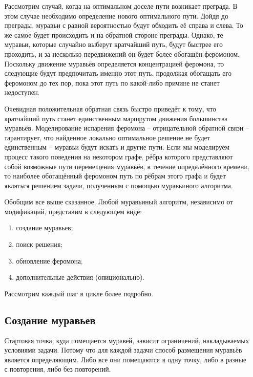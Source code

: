         Рассмотрим случай, когда на оптимальном доселе пути возникает преграда.
        В этом случае необходимо определение нового оптимального пути. 
        Дойдя до преграды, муравьи с равной вероятностью будут обходить её справа и слева. 
        То же самое будет происходить и на обратной стороне преграды. 
        Однако, те муравьи, которые случайно выберут кратчайший путь,
        будут быстрее его проходить, и за несколько передвижений он 
        будет более обогащён феромоном.
        Поскольку движение муравьёв определяется концентрацией феромона,
        то следующие будут предпочитать именно этот путь, 
        продолжая обогащать его феромоном до тех пор,
        пока этот путь по какой-либо причине не станет недоступен.
        
        Очевидная положительная обратная связь быстро приведёт к тому,
        что кратчайший путь станет единственным маршрутом движения большинства муравьёв.
        Моделирование испарения феромона -- отрицательной обратной связи -- гарантирует,
        что найденное локально оптимальное решение не будет единственным -- муравьи
        будут искать и другие пути. 
        Если мы моделируем процесс такого поведения на некотором графе, 
        рёбра которого представляют собой возможные пути перемещения муравьёв,
        в течение определённого времени, то наиболее обогащённый феромоном путь 
        по рёбрам этого графа и будет являться решением задачи, 
        полученным с помощью муравьиного алгоритма.
        
        Обобщим все выше сказанное. 
        Любой муравьиный алгоритм, независимо от модификаций, представим в следующем виде:
        \begin{enumerate}
            \item создание муравьев;
            \item поиск решения;
            \item обновление феромона;
            \item дополнительные действия (опиционально).
        \end{enumerate}
        
        Рассмотрим каждый шаг в цикле более подробно.
        
        \subsection{Создание муравьев}
            Стартовая точка, куда помещается муравей, 
            зависит ограничений, накладываемых условиями задачи. 
            Потому что для каждой задачи способ размещения муравьёв
            является определяющим. Либо все они помещаются в одну точку,
            либо в разные с повторения, либо без повторений.

